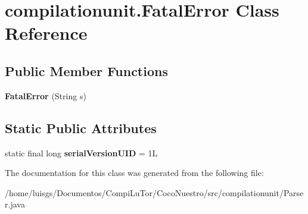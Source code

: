 \hypertarget{classcompilationunit_1_1_fatal_error}{
\section{compilationunit.FatalError Class Reference}
\label{classcompilationunit_1_1_fatal_error}
}
\subsection*{Public Member Functions}
\begin{DoxyCompactItemize}
\item 
\hypertarget{classcompilationunit_1_1_fatal_error_a787b54d8eca4f63d2c7d3a1715c95dfd}{
{\bfseries FatalError} (String s)}
\label{classcompilationunit_1_1_fatal_error_a787b54d8eca4f63d2c7d3a1715c95dfd}

\end{DoxyCompactItemize}
\subsection*{Static Public Attributes}
\begin{DoxyCompactItemize}
\item 
\hypertarget{classcompilationunit_1_1_fatal_error_a3c757b87c7c4c1b0c33eb9adce2f0536}{
static final long {\bfseries serialVersionUID} = 1L}
\label{classcompilationunit_1_1_fatal_error_a3c757b87c7c4c1b0c33eb9adce2f0536}

\end{DoxyCompactItemize}


The documentation for this class was generated from the following file:\begin{DoxyCompactItemize}
\item 
/home/luisgs/Documentos/CompiLuTor/CocoNuestro/src/compilationunit/Parser.java\end{DoxyCompactItemize}
